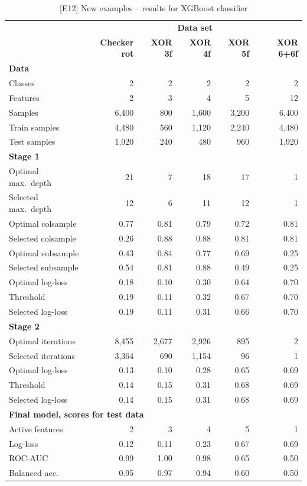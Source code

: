 \begin{table}
\caption{[E12]  New examples -- results for XGBoost classifier}
\label{tab_e12}
%
\begin{center}
\small
\begin{tabular}{|lrrrrr|}
\hline
&\multicolumn{5}{c|}{\textbf{\hrulefill\ Data set \hrulefill}}\\
&\textbf{Checker rot}&\textbf{XOR 3f}&\textbf{XOR 4f}&\textbf{XOR 5f}&\textbf{XOR 6+6f}\\
\multicolumn{6}{|l|}{\textbf{Data}}\\
Classes&2&2&2&2&2\\
Features&2&3&4&5&12\\
Samples&6,400&800&1,600&3,200&6,400\\
Train samples&4,480&560&1,120&2,240&4,480\\
Test samples&1,920&240&480&960&1,920\\
\multicolumn{6}{|l|}{\textbf{Stage 1}}\\
Optimal max.\ depth&21&7&18&17&1\\
Selected max.\ depth&12&6&11&12&1\\
Optimal colsample&0.77&0.81&0.79&0.72&0.81\\
Selected colsample&0.26&0.88&0.88&0.81&0.81\\
Optimal subsample&0.43&0.84&0.77&0.69&0.25\\
Selected subsample&0.54&0.81&0.88&0.49&0.25\\
Optimal log-loss&0.18&0.10&0.30&0.64&0.70\\
Threshold&0.19&0.11&0.32&0.67&0.70\\
Selected log-loss&0.19&0.11&0.31&0.66&0.70\\
\multicolumn{6}{|l|}{\textbf{Stage 2}}\\
Optimal iterations&8,455&2,677&2,926&895&2\\
Selected iterations&3,364&690&1,154&96&1\\
Optimal log-loss&0.13&0.10&0.28&0.65&0.69\\
Threshold&0.14&0.15&0.31&0.68&0.69\\
Selected log-loss&0.14&0.15&0.31&0.68&0.69\\
\multicolumn{6}{|l|}{\textbf{Final model, scores for test data}}\\
Active features&2&3&4&5&1\\
Log-loss&0.12&0.11&0.23&0.67&0.69\\
ROC-AUC&0.99&1.00&0.98&0.65&0.50\\
Balanced acc.&0.95&0.97&0.94&0.60&0.50\\
\hline
\end{tabular}
\end{center}
\end{table}
